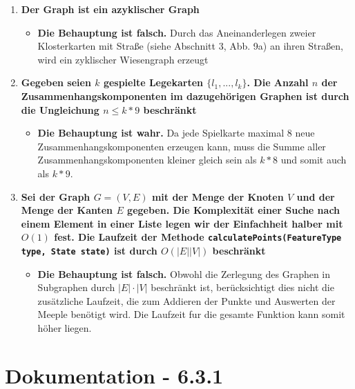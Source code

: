 \begin{enumerate}

\item \textbf{Der Graph ist ein azyklischer Graph}
	\begin{itemize}
	\item[]
		\textbf{Die Behauptung ist falsch.} Durch das Aneinanderlegen zweier Klosterkarten
		mit Straße (siehe Abschnitt 3, Abb. 9a) an ihren Straßen, wird ein zyklischer
		Wiesengraph erzeugt
	\end{itemize}
	
\item \textbf{Gegeben seien $k$ gespielte Legekarten $\{l_1,. . . ,l_k\}$. Die Anzahl $n$ der
		Zusammenhangskomponenten im dazugehörigen Graphen ist durch die
		Ungleichung $n \leq k * 9$ beschränkt}
		\begin{itemize}
		
		\item[]
			\textbf{Die Behauptung ist wahr.} Da jede Spielkarte maximal 8 neue Zusammenhangskomponenten erzeugen kann, muss die Summe aller Zusammenhangskomponenten kleiner gleich sein als $k*8$ und somit auch als $k*9$.
		\end{itemize}
		
\item \textbf{Sei der Graph $G = (V,E)$ mit der Menge der Knoten $V$ und der Menge der Kanten $E$ gegeben. Die Komplexität einer Suche nach einem Element in einer Liste legen wir der Einfachheit halber mit $O(1)$ fest. Die
			Laufzeit der Methode \texttt{calculatePoints(FeatureType type, State state)} ist durch $O(|E||V |)$ beschränkt}
			\begin{itemize}
			\item[]
				\textbf{Die Behauptung ist falsch.} Obwohl die Zerlegung des Graphen in Subgraphen durch $|E| · |V |$ beschränkt ist, berücksichtigt dies nicht die zusätzliche
				Laufzeit, die zum Addieren der Punkte und Auswerten der Meeple benötigt
				wird. Die Laufzeit fur die gesamte Funktion kann somit höher liegen.
			\end{itemize}

\end{enumerate}

\clearpage

\section{Dokumentation - 6.3.1}

